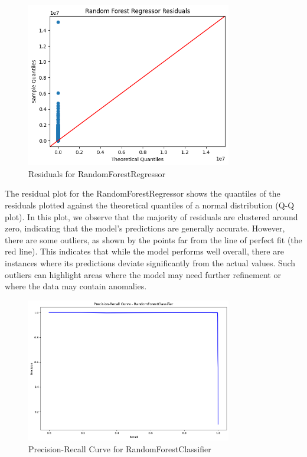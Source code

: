 \documentclass{article}
\begin{document}
\begin{figure}[H]
    \centering
    \includegraphics[width=0.8\textwidth]{images/residuals.png} %
    \caption{Residuals for RandomForestRegressor}
    \label{fig:residuals}
\end{figure}

The residual plot for the RandomForestRegressor shows the quantiles of the residuals plotted against the theoretical quantiles of a normal distribution (Q-Q plot). In this plot, we observe that the majority of residuals are clustered around zero, indicating that the model's predictions are generally accurate. However, there are some outliers, as shown by the points far from the line of perfect fit (the red line). This indicates that while the model performs well overall, there are instances where its predictions deviate significantly from the actual values. Such outliers can highlight areas where the model may need further refinement or where the data may contain anomalies.

\begin{figure}[H]
    \centering
    \includegraphics[width=0.8\textwidth]{images/precision_recall_curve.png} %
    \caption{Precision-Recall Curve for RandomForestClassifier}
    \label{fig:precision_recall_curve}
\end{figure}
\end{document}
